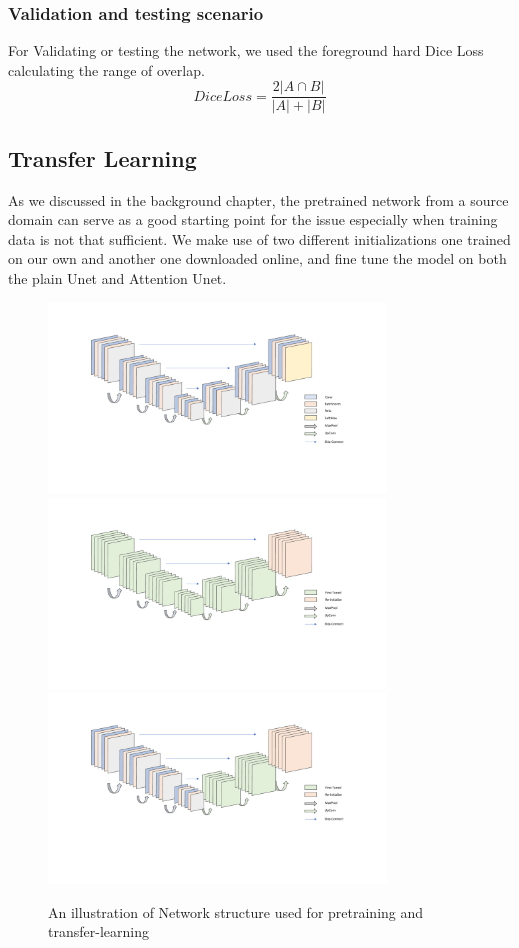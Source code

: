 \subsubsection{Validation and testing scenario}
For Validating or testing the network, we used the foreground hard Dice Loss calculating the range of overlap.
$$Dice Loss = \frac{2|A \cap B|}{|A|+|B|}$$

\subsection{Transfer Learning}
As we discussed in the background chapter, the pretrained network from a source domain can serve as a good starting point for the issue especially when training data is not that sufficient. We make use of two different initializations one trained on our own and another one downloaded online, and fine tune the model on both the plain Unet and Attention Unet.
\begin{figure}
	\centering
	\includegraphics[width=0.8\textwidth]{img/Networks/Unet-train.pdf}
	\includegraphics[width=0.8\textwidth]{img/Networks/Transfer-Finetune-all.pdf}
	\includegraphics[width=0.8\textwidth]{img/Networks/Transfer-freeze-encoder.pdf}
	\caption{An illustration of Network structure used for pretraining and transfer-learning}
	\label{fig:transfer-learning-graph}
\end{figure}

